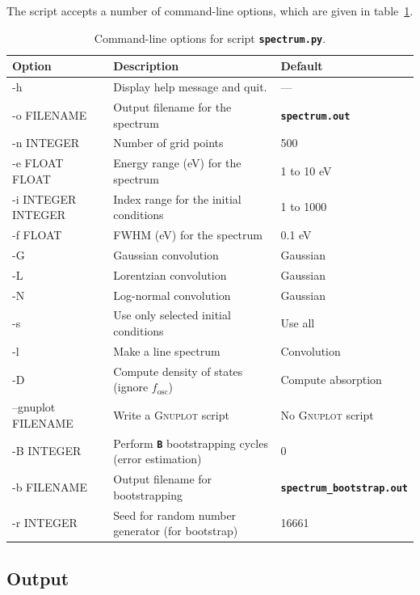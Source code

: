 \documentclass[a4paper,10pt,DIV=15,openany]{scrbook}
\newcommand{\ttt}[1]{\textbf{\texttt{#1}}}
\begin{document}
The script accepts a number of command-line options, which are given in table~\ref{tab:spectrum_opts}.
\begin{table}
  \centering
  \caption{Command-line options for script \ttt{spectrum.py}.}
  \label{tab:spectrum_opts}
  \begin{tabular}{>{\ttfamily}lll}
    \hline
    \rmfamily Option        &Description      &Default\\
    \hline
    -h                  &Display help message and quit.         &---       \\
    -o FILENAME         &Output filename for the spectrum       &\ttt{spectrum.out}\\
    -n INTEGER          &Number of grid points                  &500       \\
    -e FLOAT FLOAT      &Energy range (eV) for the spectrum     &1 to 10 eV\\
    -i INTEGER INTEGER  &Index range for the initial conditions &1 to 1000\\
    -f FLOAT            &FWHM (eV) for the spectrum             &0.1 eV\\
    -G                  &Gaussian convolution                   &Gaussian\\
    -L                  &Lorentzian convolution                 &Gaussian\\
    -N                  &Log-normal convolution                 &Gaussian\\
    -s                  &Use only selected initial conditions   &Use all\\
    -l                  &Make a line spectrum                   &Convolution\\
    -D                  &Compute density of states (ignore $f_\text{osc}$)      &Compute absorption\\
    --gnuplot FILENAME  &Write a \textsc{Gnuplot} script        &No \textsc{Gnuplot} script\\
    -B INTEGER          &Perform \ttt{B} bootstrapping cycles (error estimation)        &0\\
    -b FILENAME         &Output filename for bootstrapping      &\ttt{spectrum\_bootstrap.out}\\
    -r INTEGER          &Seed for random number generator (for bootstrap) &16661\\
    \hline
  \end{tabular}
\end{table}

\subsection{Output}
\end{document}
